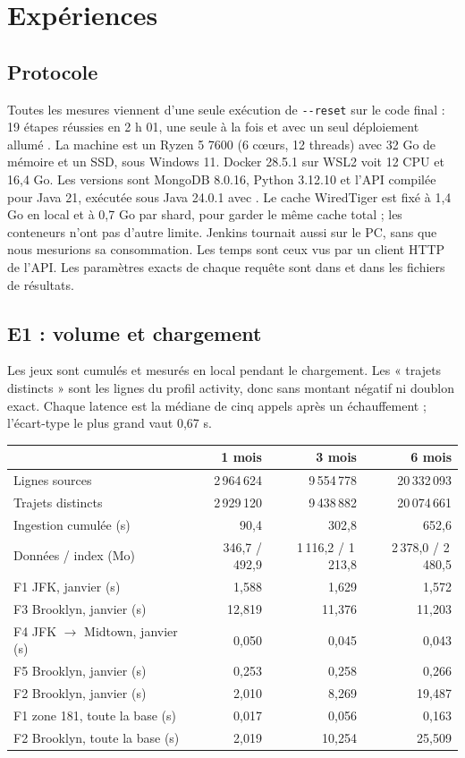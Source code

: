 \section{Expériences}\label{sec:experiences}
\subsection{Protocole}
Toutes les mesures viennent d'une seule exécution de  \texttt{-{}-reset} sur le
code final : 19 étapes réussies en 2 h 01, une seule à la fois et avec un seul
déploiement allumé \cite{experiences}. La machine est un Ryzen 5 7600 (6 cœurs, 12 threads)
avec 32 Go de mémoire et un SSD, sous Windows 11. Docker 28.5.1 sur WSL2 voit 12 CPU et
16,4 Go. Les versions sont MongoDB 8.0.16, Python 3.12.10 et l'API compilée pour Java 21,
exécutée sous Java 24.0.1 avec . Le cache WiredTiger est fixé à 1,4 Go en
local et à 0,7 Go par shard, pour garder le même cache total ; les conteneurs n'ont pas d'autre limite. Jenkins tournait
aussi sur le PC, sans que nous mesurions sa consommation. Les temps sont ceux vus par un
client HTTP de l'API. Les paramètres exacts de chaque requête sont dans
 et dans les fichiers de résultats.

\subsection{E1 : volume et chargement}
Les jeux sont cumulés et mesurés en local pendant le chargement. Les « trajets distincts »
sont les lignes du profil activity, donc sans montant négatif ni doublon exact. Chaque
latence est la médiane de cinq appels après un échauffement ; l'écart-type le plus grand
vaut 0,67 s.

\begin{center}\small
\begin{tabular}{lrrr}
\toprule
 & 1 mois & 3 mois & 6 mois\\
\midrule
Lignes sources & 2\,964\,624 & 9\,554\,778 & 20\,332\,093\\
Trajets distincts & 2\,929\,120 & 9\,438\,882 & 20\,074\,661\\
Ingestion cumulée (s) & 90,4 & 302,8 & 652,6\\
Données / index (Mo) & 346,7 / 492,9 & 1\,116,2 / 1\,213,8 & 2\,378,0 / 2\,480,5\\
\midrule
F1 JFK, janvier (s) & 1,588 & 1,629 & 1,572\\
F3 Brooklyn, janvier (s) & 12,819 & 11,376 & 11,203\\
F4 JFK $\to$ Midtown, janvier (s) & 0,050 & 0,045 & 0,043\\
F5 Brooklyn, janvier (s) & 0,253 & 0,258 & 0,266\\
F2 Brooklyn, janvier (s) & 2,010 & 8,269 & 19,487\\
\midrule
F1 zone 181, toute la base (s) & 0,017 & 0,056 & 0,163\\
F2 Brooklyn, toute la base (s) & 2,019 & 10,254 & 25,509\\
\bottomrule
\end{tabular}
\end{center}


